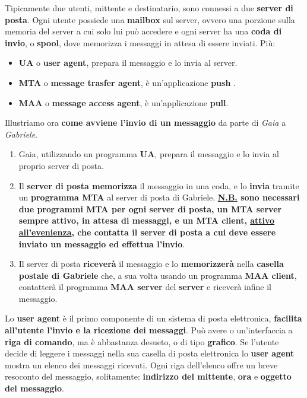 \documentclass[11pt,a4paper,oneside]{book}
\theoremstyle{definition}
\begin{document}
Tipicamente due utenti, mittente e destinatario, sono connessi a due \textbf{server di posta}. Ogni utente possiede una \textbf{mailbox} sul server, ovvero una porzione sulla memoria del server a cui solo lui può accedere e ogni server ha una \textbf{coda di invio}, o \textbf{spool}, dove memorizza i messaggi in attesa di essere inviati. Più:
\begin{itemize}
	\item \textbf{UA} o  \textbf{user agent}, prepara il messaggio e lo invia al server.
	\item \textbf{MTA} o \textbf{message trasfer agent}, è un'applicazione \textbf{push} .
	\item \textbf{MAA} o \textbf{message access agent}, è un'applicazione \textbf{pull}.
\end{itemize}

\pagebreak

Illustriamo ora \textbf{come avviene l'invio di un messaggio} da parte di \textit{Gaia} a \textit{Gabriele}.
\begin{enumerate}
	\item Gaia, utilizzando un programma \textbf{UA}, prepara il messaggio e lo invia al proprio server di posta.
	\item Il \textbf{server di posta memorizza} il messaggio in una coda, e lo \textbf{invia} tramite un \textbf{programma MTA} al server di posta di Gabriele.\textbf{ \underline{N.B.} sono necessari due programmi MTA per ogni server di posta, un MTA server sempre attivo, in attesa di messaggi, e un MTA client, \underline{attivo all'evenienza}, che contatta il server di posta a cui deve essere inviato un messaggio  ed effettua l'invio}.
	\item Il server di posta \textbf{riceverà} il messaggio e lo \textbf{memorizzerà} nella \textbf{casella postale di Gabriele} che, a sua volta usando un programma \textbf{MAA client}, contatterà il programma \textbf{MAA server} del \textbf{server} e riceverà infine il messaggio.
\end{enumerate}
Lo \textbf{user agent} è il primo componente di un sistema di posta elettronica, \textbf{facilita all'utente l'invio e la ricezione dei messaggi}. Può avere o un'interfaccia a \textbf{riga di comando}, ma è abbastanza desueto, o di tipo \textbf{grafico}. Se l'utente decide di leggere i messaggi nella sua casella di posta elettronica lo \textbf{user agent} mostra un elenco dei messaggi ricevuti. Ogni riga dell'elenco offre un breve resoconto del messaggio, solitamente: \textbf{indirizzo del mittente}, \textbf{ora} e \textbf{oggetto del messaggio}.
\end{document}
